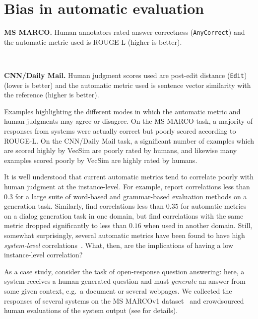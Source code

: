 \section{\label{sec:bias} Bias in automatic evaluation}




\begin{table*}
  \begin{subtable}{\textwidth}
  \centering
  
  \caption{\textbf{MS MARCO.} Human annotators rated answer correctness (\texttt{AnyCorrect}) and the automatic metric used is ROUGE-L (higher is better).}
  \end{subtable} \vspace{1em} \\
  \begin{subtable}{\textwidth}
  \centering
  
  \caption{\textbf{CNN/Daily Mail.} Human judgment scores used are post-edit distance (\texttt{Edit}) (lower is better) and the automatic metric used is sentence vector similarity with the reference (higher is better).}
  \end{subtable}
  \caption{\label{tab:examples}
    Examples highlighting the different modes in which the automatic metric and human judgments may agree or disagree.
    On the MS MARCO task, a majority of responses from systems were actually correct but poorly scored according to ROUGE-L.
    On the CNN/Daily Mail task, a significant number of examples which are scored highly by VecSim are poorly rated by humans, and likewise many examples scored poorly by VecSim are highly rated by humans.
  }
\end{table*}

It is well understood that current automatic metrics tend to correlate poorly with human judgment at the instance-level.
For example, \citet{novikova2017why} report correlations less than $0.3$ for a large suite of word-based and grammar-based evaluation methods on a generation task.
Similarly, \citet{liu2016evaluate} find correlations less than $0.35$ for automatic metrics on a dialog generation task in one domain, but find correlations with the same metric dropped significantly to less than $0.16$ when used in another domain. 
Still, somewhat surprisingly, several automatic metrics have been found to have high \textit{system-level} correlations~\citep{novikova2017why}.
What, then, are the implications of having a low instance-level correlation?  

As a case study, consider the task of open-response question answering:
  here, a system receives a human-generated question and must \textit{generate} an answer from some given context, e.g.\ a document or several webpages.
  We collected the responses of several systems on the MS MARCOv1 dataset~\citep{nguyen2016ms} and crowdsourced human evaluations of the system output
  (see  for details).

